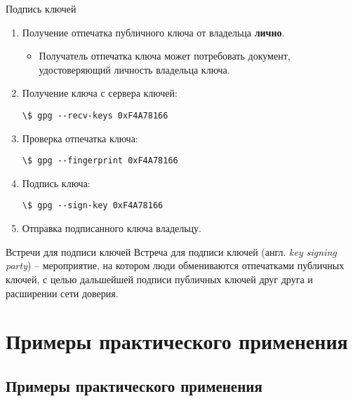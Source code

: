 \documentclass[presentation]{beamer}
\begin{document}
\begin{frame}[fragile]{Подпись ключей}
  \begin{enumerate}
  \item Получение отпечатка публичного ключа от владельца
    \textbf{лично}.
    \begin{itemize}
    \item Получатель отпечатка ключа может потребовать документ,
      удостоверяющий личность владельца ключа.
    \end{itemize}
  \item Получение ключа с сервера ключей:
    \begin{Verbatim}[commandchars=\\\[\]]
      \$ gpg --recv-keys 0xF4A78166
    \end{Verbatim}
  \item Проверка отпечатка ключа:
    \begin{Verbatim}[commandchars=\\\[\]]
      \$ gpg --fingerprint 0xF4A78166
    \end{Verbatim}
  \item Подпись ключа:
    \begin{Verbatim}[commandchars=\\\[\]]
      \$ gpg --sign-key 0xF4A78166
    \end{Verbatim}
  \item Отправка подписанного ключа владельцу.
  \end{enumerate}
\end{frame}

\begin{frame}{Встречи для подписи ключей}
  \raisebox{-.30em}{\Large\HandRight}\hspace{.25em} Встреча для
  подписи ключей (англ. \emph{key signing party}) -- мероприятие, на
  котором люди обмениваются отпечатками публичных ключей, с целью
  дальшейшей подписи публичных ключей друг друга и расширении сети
  доверия.
\end{frame}


\section{Примеры практического применения}

\subsection{Примеры практического применения}
\end{document}
